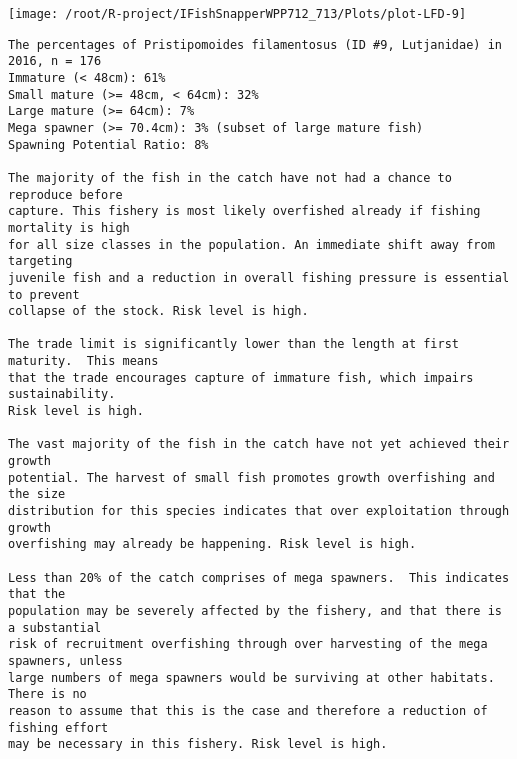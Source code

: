 \documentclass{report}\usepackage[]{graphicx}\usepackage[]{color}
\makeatletter
\def\maxwidth{ %
  \ifdim\Gin@nat@width>\linewidth
    \linewidth
  \else
    \Gin@nat@width
  \fi
}
\newenvironment{kframe}{%
 \def\at@end@of@kframe{}%
 \ifinner\ifhmode%
  \def\at@end@of@kframe{\end{minipage}}%
  \begin{minipage}{\columnwidth}%
 \fi\fi%
 \def\FrameCommand##1{\hskip\@totalleftmargin \hskip-\fboxsep
 \colorbox{shadecolor}{##1}\hskip-\fboxsep
     \hskip-\linewidth \hskip-\@totalleftmargin \hskip\columnwidth}%
 \MakeFramed {\advance\hsize-\width
   \@totalleftmargin\z@ \linewidth\hsize
   \@setminipage}}%
 {\par\unskip\endMakeFramed%
 \at@end@of@kframe}
\newenvironment{knitrout}{}{} %
\makeatother
\begin{document}
\begin{knitrout}
\begin{kframe}
{\ttfamily\noindent\color{warningcolor}{Warning in predict.lm(lm\_perc\_imm, newdata = data.frame(x = X)): prediction from a rank-deficient fit may be misleading}}

{\ttfamily\noindent\color{warningcolor}{Warning in predict.lm(lm\_perc\_lmat, newdata = data.frame(x = X)): prediction from a rank-deficient fit may be misleading}}

{\ttfamily\noindent\color{warningcolor}{Warning in predict.lm(lm\_perc\_megasp, newdata = data.frame(x = X)): prediction from a rank-deficient fit may be misleading}}

{\ttfamily\noindent\color{warningcolor}{Warning in predict.lm(lm\_perc\_spr, newdata = data.frame(x = X)): prediction from a rank-deficient fit may be misleading}}\end{kframe}
\texttt{[image: /root/R-project/IFishSnapperWPP712\_713/Plots/plot-LFD-9]} 
\begin{kframe}\begin{verbatim}
The percentages of Pristipomoides filamentosus (ID #9, Lutjanidae) in 2016, n = 176
Immature (< 48cm): 61%
Small mature (>= 48cm, < 64cm): 32%
Large mature (>= 64cm): 7%
Mega spawner (>= 70.4cm): 3% (subset of large mature fish)
Spawning Potential Ratio: 8%
 
The majority of the fish in the catch have not had a chance to reproduce before
capture. This fishery is most likely overfished already if fishing mortality is high
for all size classes in the population. An immediate shift away from targeting
juvenile fish and a reduction in overall fishing pressure is essential to prevent
collapse of the stock. Risk level is high.

The trade limit is significantly lower than the length at first maturity.  This means
that the trade encourages capture of immature fish, which impairs sustainability.
Risk level is high.

The vast majority of the fish in the catch have not yet achieved their growth
potential. The harvest of small fish promotes growth overfishing and the size
distribution for this species indicates that over exploitation through growth
overfishing may already be happening. Risk level is high.

Less than 20% of the catch comprises of mega spawners.  This indicates that the
population may be severely affected by the fishery, and that there is a substantial
risk of recruitment overfishing through over harvesting of the mega spawners, unless
large numbers of mega spawners would be surviving at other habitats. There is no
reason to assume that this is the case and therefore a reduction of fishing effort
may be necessary in this fishery. Risk level is high.
 

\end{verbatim}
\end{kframe}
\end{knitrout}
\end{document}
